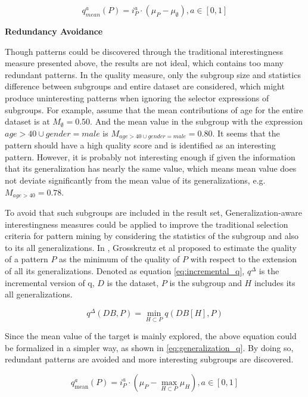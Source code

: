 \begin{equation}  \label{eq:mean_based}
q_{m e a n}^{a}(P)=i_{P}^{a} \cdot\left(\mu_{P}-\mu_{\emptyset}\right), a \in[0,1]
\end{equation}

\textbf{Redundancy Avoidance}

Though patterns could be discovered through the traditional interestingness measure presented above, the results are not ideal, which contains too many redundant patterns. In the quality measure, only the subgroup size and statistics difference between subgroups and entire dataset are considered, which might produce uninteresting patterns when ignoring the selector expressions of subgroups. For example, assume that the mean contributions of age for the entire dataset is at $M_{\emptyset}=0.50$. And the mean value in the subgroup with the expression $age > 40 \cup gender=male$ is $M_{age > 40 \cup gender=male}=0.80$. It seems that the pattern should have a high quality score and is identified as an interesting pattern. However, it is probably not interesting enough if given the information that its generalization has nearly the same value, which means mean value does not deviate significantly from the mean value of its generalizations, e.g. $M_{age > 40} = 0.78$. 

To avoid that such subgroups are included in the result set, Generalization-aware interestingness measures could be applied to improve the traditional selection criteria for pattern mining by considering the statistics of the subgroup and also to its all generalizations. In \cite{grosskreutz2010subgroup}, Grosskreutz et al proposed to estimate the quality of a pattern $P$ as the minimum of the quality of $P$ with respect to the extension of all its generalizations. Denoted as equation \ref{eq:incremental_q}, $q^{\Delta}$ is the incremental version of q, $D$ is the dataset, $P$ is the subgroup and $H$ includes its all generalizations. 

\begin{equation} \label{eq:incremental_q}
q^{\Delta}(D B, P)=\min _{H \subset P} q\left(D B\left[H\right], P\right)
\end{equation}

Since the mean value of the target is mainly explored, the above equation could be formalized in a simpler way, as shown in \ref{eq:generalization_q}. By doing so, redundant patterns are avoided and more interesting subgroups are discovered. 

\begin{equation} \label{eq:generalization_q}
q_{\operatorname{mean}}^{a}(P)=i_{P}^{a} \cdot\left(\mu_{P}-\max _{H \subset P} \mu_{H}\right), a \in[0,1]
\end{equation}

